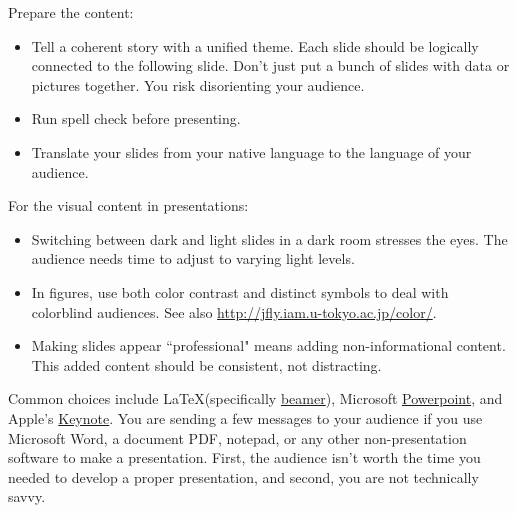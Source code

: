 
Prepare the content:
\begin{itemize}
    \item Tell a coherent story with a unified theme. Each slide should be logically connected to the following slide. Don't just put a bunch of slides with data or pictures together. You risk disorienting your audience.
    \item Run spell check before presenting.
    \item Translate your slides from your native language to the language of your audience.
\end{itemize}


For the visual content in presentations:
\begin{itemize}
    \item Switching between dark and light slides in a dark room stresses the eyes. The audience needs time to adjust to varying light levels.
    \item In figures, use both color contrast and distinct symbols to deal with colorblind audiences. See also \href{http://jfly.iam.u-tokyo.ac.jp/color/}{http://jfly.iam.u-tokyo.ac.jp/color/}.
    \item Making slides appear ``professional" means adding non-informational content. This added content should be consistent, not distracting.
\end{itemize}

Common choices include \LaTeX (specifically \href{https://en.wikipedia.org/wiki/Beamer_(LaTeX)}{beamer}), 
\iftoggle{WPinmargin}{\marginpar{[Wikipedia] Beamer}}{}
Microsoft \href{https://en.wikipedia.org/wiki/Microsoft_PowerPoint}{Powerpoint}, 
and Apple's \href{https://en.wikipedia.org/wiki/Keynote_(presentation_software)}{Keynote}. 
You are sending a few messages to your audience if you use Microsoft Word, a document PDF, notepad, or any other non-presentation software to make a presentation.
First, the audience isn't worth the time you needed to develop a proper presentation, and second, you are not technically savvy.

